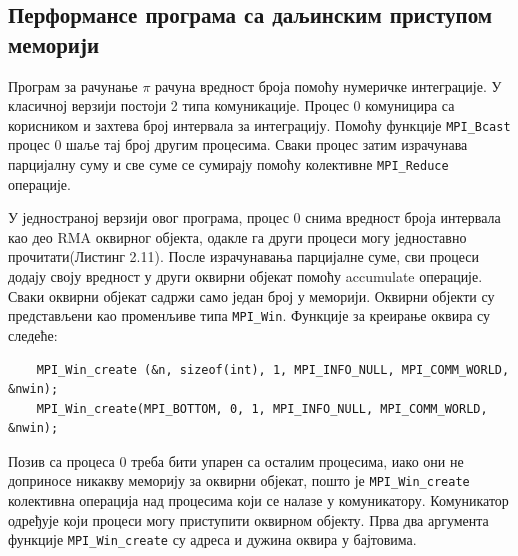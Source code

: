 \subsection{Перформансе програма са даљинским приступом меморији}

Програм за рачунање $\pi$ рачуна вредност броја помоћу нумеричке интеграције. У класичној  верзији постоји 2 типа комуникације. Процес 0 комуницира са корисником и захтева број интервала за интеграцију. Помоћу функције \texttt{MPI\_Bcast} процес 0 шаље тај број другим процесима. Сваки процес затим израчунава парцијалну суму и све суме се сумирају помоћу колективне \texttt{MPI\_Reduce} операције.

У једностраној верзији овог програма, процес 0 снима вредност броја интервала као део RMA оквирног објекта, одакле га други процеси могу једноставно прочитати(Листинг 2.11). После израчунавања парцијалне суме, сви процеси додају своју вредност у други оквирни објекат помоћу accumulate операције. Сваки оквирни објекат садржи само један број у меморији. Оквирни објекти су представљени као променљиве типа \texttt{MPI\_Win}. Функције за креирање оквира су следеће:

\begin{verbatim}
	MPI_Win_create (&n, sizeof(int), 1, MPI_INFO_NULL, MPI_COMM_WORLD, &nwin);
	MPI_Win_create(MPI_BOTTOM, 0, 1, MPI_INFO_NULL, MPI_COMM_WORLD, &nwin);
\end{verbatim}

Позив са процеса 0 треба бити упарен са осталим процесима, иако они не доприносе никакву меморију за оквирни објекат, пошто је \texttt{MPI\_Win\_create} колективна операција над процесима који се налазе у комуникатору. Комуникатор одређује који процеси могу приступити оквирном објекту. Прва два аргумента функције  \texttt{MPI\_Win\_create} су адреса и дужина оквира у бајтовима.

